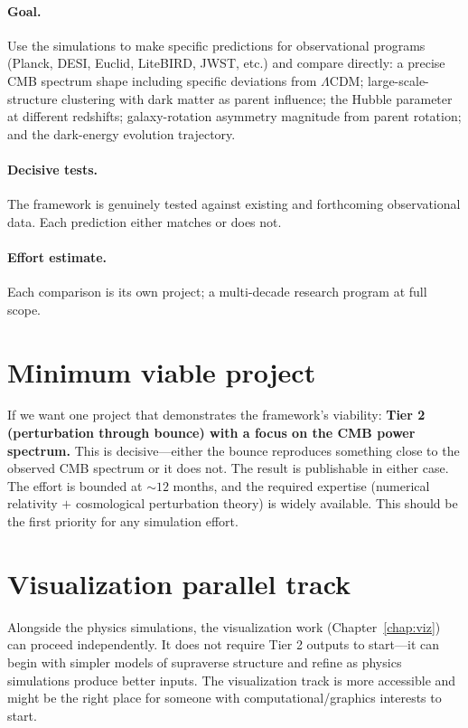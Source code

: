 \paragraph{Goal.} Use the simulations to make specific predictions for
observational programs (Planck, DESI, Euclid, LiteBIRD, JWST, etc.) and compare
directly: a precise CMB spectrum shape including specific deviations from
$\Lambda$CDM; large-scale-structure clustering with dark matter as parent
influence; the Hubble parameter at different redshifts; galaxy-rotation asymmetry
magnitude from parent rotation; and the dark-energy evolution trajectory.

\paragraph{Decisive tests.} The framework is genuinely tested against existing
and forthcoming observational data. Each prediction either matches or does not.

\paragraph{Effort estimate.} Each comparison is its own project; a multi-decade
research program at full scope.

\section{Minimum viable project}

If we want one project that demonstrates the framework's viability:
\textbf{Tier 2 (perturbation through bounce) with a focus on the CMB power
spectrum.} This is decisive---either the bounce reproduces something close to the
observed CMB spectrum or it does not. The result is publishable in either case.
The effort is bounded at $\sim 12$ months, and the required expertise (numerical
relativity $+$ cosmological perturbation theory) is widely available. This should
be the first priority for any simulation effort.

\section{Visualization parallel track}

Alongside the physics simulations, the visualization work
(Chapter~\ref{chap:viz}) can proceed independently. It does not require Tier 2
outputs to start---it can begin with simpler models of supraverse structure and
refine as physics simulations produce better inputs. The visualization track is
more accessible and might be the right place for someone with
computational/graphics interests to start.

